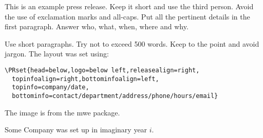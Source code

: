 \documentclass[a4paper,11pt]{pressrelease}
\begin{document}
\begin{pressrelease}

This is an example press release. Keep it short and use the third
person. Avoid the use of exclamation marks and all-caps. Put all the
pertinent details in the first paragraph. Answer who, what, when,
where and why.

Use short paragraphs. Try not to exceed 500 words. Keep to the point
and avoid jargon. The layout was set using:
\begin{verbatim}
\PRset{head=below,logo=below left,releasealign=right,
  topinfoalign=right,bottominfoalign=left,
  topinfo=company/date,
  bottominfo=contact/department/address/phone/hours/email}
\end{verbatim}
The image is from the \textsf{mwe} package.

\begin{about}
Some Company was set up in imaginary year $i$.
\end{about}

\end{pressrelease}
\end{document}
